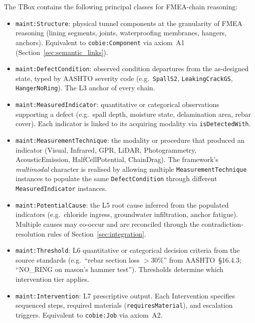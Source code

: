 \documentclass[11pt,a4paper]{article}
\begin{document}
The TBox contains the following principal classes for FMEA-chain reasoning:
\begin{itemize}[leftmargin=*, itemsep=0.3em]
  \item \texttt{maint:Structure}: physical tunnel components at the granularity of FMEA reasoning (lining segments, joints, waterproofing membranes, hangers, anchors). Equivalent to
    \texttt{cobie:Component} via axiom~A1 (Section~\ref{sec:semantic_links}).
  \item \texttt{maint:DefectCondition}: observed condition departures from the as-designed state, typed by AASHTO severity code (e.g.\ \texttt{SpallS2}, \texttt{LeakingCrackGS},
    \texttt{HangerNoRing}). The L3 anchor of every chain.
  \item \texttt{maint:MeasuredIndicator}: quantitative or categorical observations supporting a defect (e.g.\ spall depth, moisture state, delamination area, rebar cover). Each indicator is linked to its acquiring modality via \texttt{isDetectedWith}.
  \item \texttt{maint:MeasurementTechnique}: the modality or procedure that produced an indicator (Visual, Infrared, GPR, LiDAR, Photogrammetry, AcousticEmission,
    HalfCellPotential, ChainDrag). The framework's \emph{multimodal} character is realised by allowing multiple \texttt{MeasurementTechnique} instances to populate the same \texttt{DefectCondition} through different \texttt{MeasuredIndicator} instances.
  \item \texttt{maint:PotentialCause}: the L5 root cause inferred from the populated indicators (e.g.\ chloride ingress, groundwater infiltration, anchor fatigue). Multiple causes may
    co-occur and are reconciled through the contradiction-resolution rules of Section~\ref{sec:integration}.
  \item \texttt{maint:Threshold}: L6 quantitative or categorical decision criteria from the source standards (e.g.\ ``rebar section loss $>30\%$'' from AASHTO~\S16.4.3; ``NO\_RING on mason's hammer test''). Thresholds determine which intervention tier applies.
  \item \texttt{maint:Intervention}: L7 prescriptive output. Each Intervention specifies sequenced steps, required materials (\texttt{requiresMaterial}), and escalation triggers.
    Equivalent to \texttt{cobie:Job} via axiom~A2.
\end{itemize}
\end{document}
